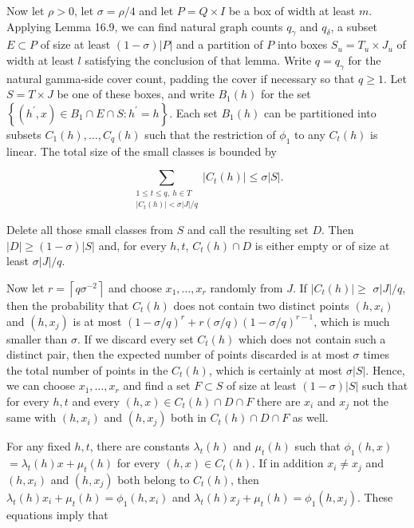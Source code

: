 \documentclass[10pt]{article}
\begin{document}
Now let $\rho>0$, let $\sigma=\rho / 4$ and let $P=Q \times I$ be a box of width at least $m$. Applying Lemma 16.9, we can find natural graph counts $q_{\gamma}$ and $q_{\delta}$, a subset $E \subset P$ of size at least $(1-\sigma)|P|$ and a partition of $P$ into boxes $S_{u}=T_{u} \times J_{u}$ of width at least $l$ satisfying the conclusion of that lemma. Write $q=q_{\gamma}$ for the natural gamma-side cover count, padding the cover if necessary so that $q\geqslant1$. Let $S=T \times J$ be one of these boxes, and write $B_{1}(h)$ for the set $\left\{\left(h^{\prime}, x\right) \in B_{1} \cap E \cap S: h^{\prime}=h\right\}$. Each set $B_{1}(h)$ can be partitioned into subsets $C_{1}(h), \ldots, C_{q}(h)$ such that the restriction of $\phi_{1}$ to any $C_{t}(h)$ is linear. The total size of the small classes is bounded by

$$
\sum_{\substack{1\leqslant t\leqslant q,\ h\in T\\
 |C_{t}(h)|<\sigma|J|/q}} |C_{t}(h)| \leqslant \sigma|S| .
$$

Delete all those small classes from $S$ and call the resulting set $D$. Then $|D|\geqslant(1-\sigma)|S|$ and, for every $h,t$, $C_{t}(h) \cap D$ is either empty or of size at least $\sigma|J| / q$.

Now let $r=\left\lceil q \sigma^{-2}\right\rceil$ and choose $x_{1}, \ldots, x_{r}$ randomly from $J$. If $\left|C_{t}(h)\right| \geqslant$ $\sigma|J| / q$, then the probability that $C_{t}(h)$ does not contain two distinct points $\left(h, x_{i}\right)$ and $\left(h, x_{j}\right)$ is at most $(1-\sigma / q)^{r}+r(\sigma / q)(1-\sigma / q)^{r-1}$, which is much\\
smaller than $\sigma$. If we discard every set $C_{t}(h)$ which does not contain such a distinct pair, then the expected number of points discarded is at most $\sigma$ times the total number of points in the $C_{t}(h)$, which is certainly at most $\sigma|S|$. Hence, we can choose $x_{1}, \ldots, x_{r}$ and find a set $F \subset S$ of size at least $(1-\sigma)|S|$ such that for every $h, t$ and every $(h, x) \in C_{t}(h) \cap D \cap F$ there are $x_{i}$ and $x_{j}$ not the same with $\left(h, x_{i}\right)$ and $\left(h, x_{j}\right)$ both in $C_{t}(h) \cap D \cap F$ as well.

For any fixed $h, t$, there are constants $\lambda_{t}(h)$ and $\mu_{t}(h)$ such that $\phi_{1}(h, x)$ $=\lambda_{t}(h) x+\mu_{t}(h)$ for every $(h, x) \in C_{t}(h)$. If in addition $x_{i} \neq x_{j}$ and $\left(h, x_{i}\right)$ and $\left(h, x_{j}\right)$ both belong to $C_{t}(h)$, then $\lambda_{t}(h) x_{i}+\mu_{t}(h)=\phi_{1}\left(h, x_{i}\right)$ and $\lambda_{t}(h) x_{j}+\mu_{t}(h)=\phi_{1}\left(h, x_{j}\right)$. These equations imply that
\end{document}
